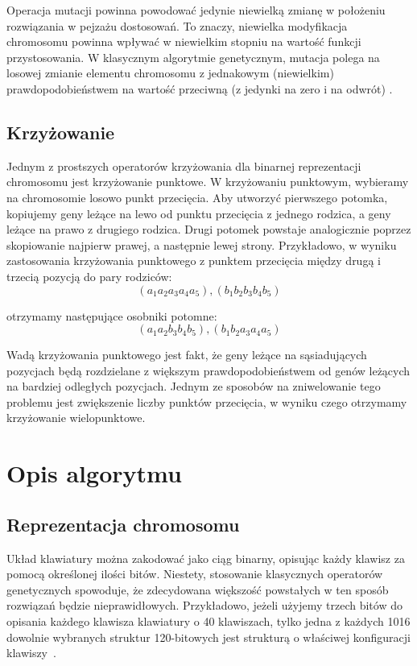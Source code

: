 \documentclass{xmgr}
\begin{document}
Operacja mutacji powinna powodować jedynie niewielką zmianę w położeniu rozwiązania w pejzażu dostosowań. To znaczy, niewielka modyfikacja chromosomu powinna wpływać w niewielkim stopniu na wartość funkcji przystosowania. W klasycznym algorytmie genetycznym, mutacja polega na losowej zmianie elementu chromosomu z jednakowym (niewielkim) prawdopodobieństwem na wartość przeciwną (z jedynki na zero i na odwrót) \cite{Goldberg:1998:AGZ}.

\section{Krzyżowanie}

Jednym z prostszych operatorów krzyżowania dla binarnej reprezentacji chromosomu jest krzyżowanie punktowe. W krzyżowaniu punktowym, wybieramy na chromosomie losowo punkt przecięcia. Aby utworzyć pierwszego potomka, kopiujemy geny leżące na lewo od punktu przecięcia z jednego rodzica, a geny leżące na prawo z drugiego rodzica. Drugi potomek powstaje analogicznie poprzez skopiowanie najpierw prawej, a następnie lewej strony. Przykładowo, w wyniku zastosowania krzyżowania punktowego z punktem przecięcia między drugą i trzecią pozycją do pary rodziców:
$$(a_1 a_2 a_3 a_4 a_5), (b_1 b_2 b_3 b_4 b_5)$$

otrzymamy następujące osobniki potomne:
$$(a_1 a_2 b_3 b_4 b_5), (b_1 b_2 a_3 a_4 a_5)$$

Wadą krzyżowania punktowego jest fakt, że geny leżące na sąsiadujących pozycjach będą rozdzielane z większym prawdopodobieństwem od genów leżących na bardziej odległych pozycjach. Jednym ze sposobów na zniwelowanie tego problemu jest zwiększenie liczby punktów przecięcia, w wyniku czego otrzymamy krzyżowanie wielopunktowe.


\chapter{Opis algorytmu}


\section{Reprezentacja chromosomu}

Układ klawiatury można zakodować jako ciąg binarny, opisując każdy klawisz za pomocą określonej ilości bitów. Niestety, stosowanie klasycznych operatorów genetycznych spowoduje, że zdecydowana większość powstałych w ten sposób rozwiązań będzie nieprawidłowych. Przykładowo, jeżeli użyjemy trzech bitów do opisania każdego klawisza klawiatury o 40 klawiszach, tylko jedna z każdych 1016 dowolnie wybranych struktur 120-bitowych jest strukturą o właściwej konfiguracji klawiszy~\cite{GloverKey}.
\end{document}
